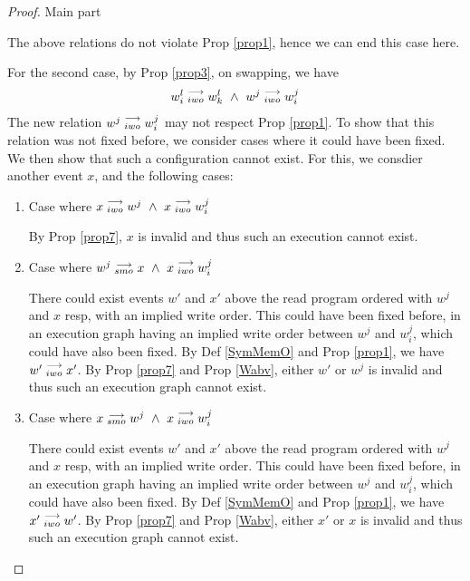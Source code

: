 \begin{proof}{Main part}
\begin{itemize}
                        The above relations do not violate Prop \ref{prop1}, hence we can end this case here. 

                        For the second case, by Prop \ref{prop3}, on swapping, we have 
                        \begin{align*}
                            \reln{w_i^l}{iwo}{w_k^l} \ \wedge \ \reln{w^j}{iwo}{w_i^j}
                        \end{align*}
                        The new relation $w^j\stackrel{\longrightarrow}{_{iwo}}w_i^j$ may not respect Prop \ref{prop1}. 
                        To show that this relation was not fixed before, we consider cases where it could have been fixed. We then show that such a configuration cannot exist. For this, we consdier another event $x$, and the following cases:

                        \begin{enumerate}
                            
                            \item Case where $x\stackrel{\longrightarrow}{_{iwo}}w^j \ \wedge \ x\stackrel{\longrightarrow}{_{iwo}}w_i^j$
                            
                                By Prop \ref{prop7}, $x$ is invalid and thus such an execution cannot exist. 
                            
                            \item Case where $w^j\stackrel{\longrightarrow}{_{smo}}x \ \wedge \ x\stackrel{\longrightarrow}{_{iwo}}w_i^j$
                        
                                There could exist events $w'$ and $x'$ above the read program ordered with $w^j$ and $x$ resp, with an implied write order. This could have been fixed before, in an execution graph having an implied write order between $w^j$ and $w_i^j$, which could have also been fixed.
                                By Def \ref{SymMemO} and Prop \ref{prop1}, we have $w'\stackrel{\longrightarrow}{_{iwo}}x'$.
                                By Prop \ref{prop7} and Prop \ref{Wabv}, either $w'$ or $w^j$ is invalid and thus such an execution graph cannot exist. 
                            
                            \item Case where $x\stackrel{\longrightarrow}{_{smo}}w^j \ \wedge \ x\stackrel{\longrightarrow}{_{iwo}}w_i^j$
                                
                                There could exist events $w'$ and $x'$ above the read program ordered with $w^j$ and $x$ resp, with an implied write order. This could have been fixed before, in an execution graph having an implied write order between $w^j$ and $w_i^j$, which could have also been fixed.
                                By Def \ref{SymMemO} and Prop \ref{prop1}, we have $x'\stackrel{\longrightarrow}{_{iwo}}w'$.
                                By Prop \ref{prop7} and Prop \ref{Wabv}, either $x'$ or $x$ is invalid and thus such an execution graph cannot exist. 
                        

\end{enumerate}
\end{itemize}
\end{proof}
